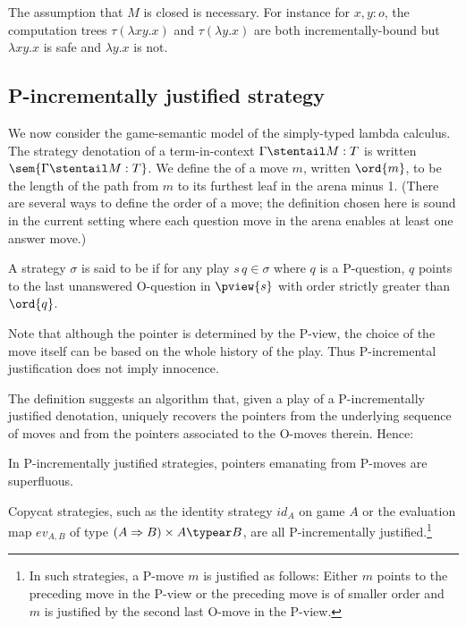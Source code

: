 The assumption that $M$ is closed is necessary. For instance for
$x,y:o$, the computation trees $\tau(\lambda x y .x)$ and
$\tau(\lambda y . x)$ are both incrementally-bound but $\lambda x y
.x$ is safe and $\lambda y . x$ is not.

\subsection*{P-incrementally justified strategy}

We now consider the game-semantic model of the simply-typed lambda
calculus. The strategy denotation of a term-in-context $\Gamma
\stentail M : T$ is written $\sem{\Gamma
\stentail M : T}$. We define the  of a move $m$,
written $\ord{m}$, to be the length of the path from $m$ to its
furthest leaf in the arena minus 1. (There are several ways to
define the order of a move; the definition chosen here is sound in
the current setting where each question move in the arena enables at
least one answer move.)

\begin{definition}\rm
  A strategy $\sigma$ is said to be  if for any play $s \, q \in \sigma$ where $q$ is a
  P-question, $q$ points to the last unanswered O-question in $\pview{s}$ with
  order strictly greater than $\ord{q}$.
\end{definition}
Note that although the pointer is determined by the P-view, the
choice of the move itself can be based on the whole history of the
play. Thus P-incremental justification does not imply innocence.

The definition suggests an algorithm that, given a play of a
P-incrementally justified denotation, uniquely recovers the pointers
from the underlying sequence of moves and from the pointers
associated to the O-moves therein. Hence:
\begin{lemma}
\label{lem:incrjustified_pointers_uniqu_recover} In P-incrementally
justified strategies, pointers emanating from P-moves are
superfluous.
\end{lemma}

\begin{example}
Copycat strategies, such as the identity strategy $id_A$ on game $A$
or the evaluation map $ev_{A,B}$ of type $(A \Rightarrow B) \times A
\typear B$, are all P-incrementally justified.\footnote{In such
strategies, a P-move $m$ is justified as follows: Either $m$ points
to the preceding move in the P-view or the preceding move is of
smaller order and $m$ is justified by the second last O-move in the
P-view.}
\end{example}


